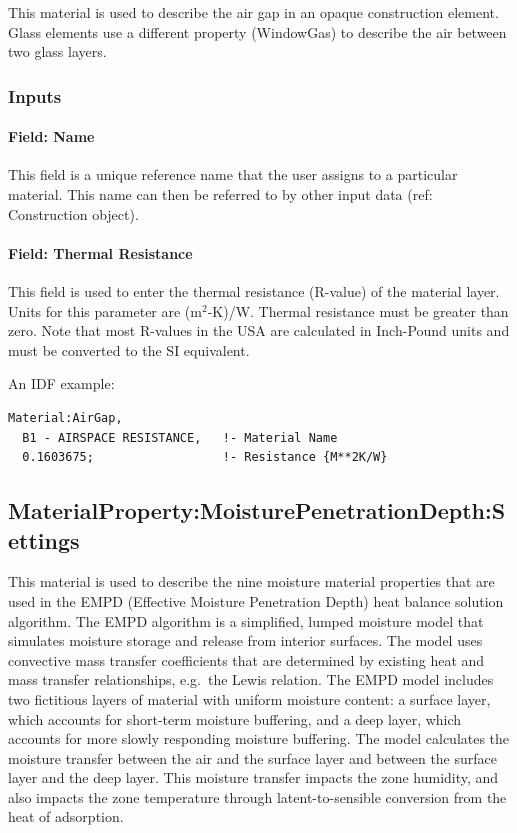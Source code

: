 This material is used to describe the air gap in an opaque construction element. Glass elements use a different property (WindowGas) to describe the air between two glass layers.

\subsubsection{Inputs}\label{inputs-3-036}

\paragraph{Field: Name}\label{field-name-3-031}

This field is a unique reference name that the user assigns to a particular material. This name can then be referred to by other input data (ref: Construction object).

\paragraph{Field: Thermal Resistance}\label{field-thermal-resistance-1}

This field is used to enter the thermal resistance (R-value) of the material layer. Units for this parameter are (m\(^{2}\)-K)/W. Thermal resistance must be greater than zero. Note that most R-values in the USA are calculated in Inch-Pound units and must be converted to the SI equivalent.

An IDF example:

\begin{lstlisting}
Material:AirGap,
  B1 - AIRSPACE RESISTANCE,   !- Material Name
  0.1603675;                  !- Resistance {M**2K/W}
\end{lstlisting}

\subsection{MaterialProperty:MoisturePenetrationDepth:Settings}\label{materialpropertymoisturepenetrationdepthsettings}

This material is used to describe the nine moisture material properties that are used in the EMPD (Effective Moisture Penetration Depth) heat balance solution algorithm. The EMPD algorithm is a simplified, lumped moisture model that simulates moisture storage and release from interior surfaces. The model uses convective mass transfer coefficients that are determined by existing heat and mass transfer relationships, e.g.~the Lewis relation. The EMPD model includes two fictitious layers of material with uniform moisture content: a surface layer, which accounts for short-term moisture buffering, and a deep layer, which accounts for more slowly responding moisture buffering. The model calculates the moisture transfer between the air and the surface layer and between the surface layer and the deep layer. This moisture transfer impacts the zone humidity, and also impacts the zone temperature through latent-to-sensible conversion from the heat of adsorption.

